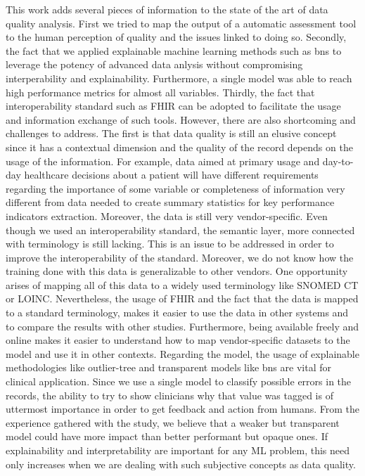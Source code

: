 This work adds several pieces of information to the state of the art of data quality analysis. First we tried to map the output of a automatic assessment tool to the human perception of quality and the issues linked to doing so. Secondly, the fact that we applied explainable machine learning methods such as \acp{bn} to leverage the potency of advanced data anlysis without compromising interperability and explainability. Furthermore, a single model was able to reach high performance metrics for almost all variables. Thirdly, the fact that interoperability standard such as FHIR can be adopted to facilitate the usage and information exchange of such tools. However, there are also shortcoming and challenges to address. The first is that data quality is still an elusive concept since it has a contextual dimension and the quality of the record depends on the usage of the information. For example, data aimed at primary usage and day-to-day healthcare decisions about a patient will have different requirements regarding the importance of some variable or completeness of information very different from data needed to create summary statistics for key performance indicators extraction. Moreover, the data is still very vendor-specific. Even though we used an interoperability standard, the semantic layer, more connected with terminology is still lacking. This is an issue to be addressed in order to improve the interoperability of the standard. Moreover, we do not know how the training done with this data is generalizable to other vendors. One opportunity arises of mapping all of this data to a widely used terminology like SNOMED CT or LOINC. Nevertheless, the usage of FHIR and the fact that the data is mapped to a standard terminology, makes it easier to use the data in other systems and to compare the results with other studies. Furthermore, being available freely and online makes it easier to understand how to map vendor-specific datasets to the model and use it in other contexts. Regarding the model, the usage of explainable methodologies like outlier-tree and transparent models like \acp{bn} are vital for clinical application. Since we use a single model to classify possible errors in the records, the ability to try to show clinicians why that value was tagged is of uttermost importance in order to get feedback and action from humans. From the experience gathered with the study, we believe that a weaker but transparent model could have more impact than better performant but opaque ones. If explainability and interpretability are important for any ML problem, this need only increases when we are dealing with such subjective concepts as data quality.

